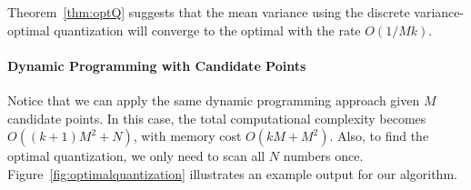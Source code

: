 \documentclass{article}
\newcommand{\setI}{\mathcal{I}}
\begin{document}
\vspace{-0.5em}
Theorem~\ref{thm:optQ} suggests that the mean variance using the discrete variance-optimal quantization will converge to the optimal with the rate $O(1/Mk)$.

\vspace{-0.5em}
\paragraph*{Dynamic Programming with Candidate Points}
Notice that we can apply the same dynamic programming approach given $M$ candidate points. 
In this case, the total computational complexity becomes $O((k+1)M^2 + N)$, with memory cost 
$O(kM + M^2)$. Also, to find the optimal quantization,  we only need to scan all $N$ numbers once.
Figure~\ref{fig:optimalquantization} illustrates an example output for our algorithm.







\end{document}
